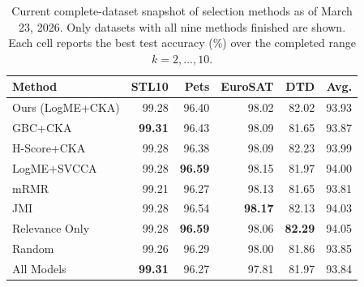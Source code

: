\begin{table}[t]
\centering
\small
\begin{tabular}{lrrrrr}
\hline
Method & STL10 & Pets & EuroSAT & DTD & Avg. \\
\hline
Ours (LogME+CKA) & 99.28 & 96.40 & 98.02 & 82.02 & 93.93 \\
GBC+CKA & \textbf{99.31} & 96.43 & 98.09 & 81.65 & 93.87 \\
H-Score+CKA & 99.28 & 96.38 & 98.09 & 82.23 & 93.99 \\
LogME+SVCCA & 99.28 & \textbf{96.59} & 98.15 & 81.97 & 94.00 \\
mRMR & 99.21 & 96.27 & 98.13 & 81.65 & 93.81 \\
JMI & 99.28 & 96.54 & \textbf{98.17} & 82.13 & 94.03 \\
Relevance Only & 99.28 & \textbf{96.59} & 98.06 & \textbf{82.29} & 94.05 \\
Random & 99.26 & 96.29 & 98.00 & 81.86 & 93.85 \\
All Models & \textbf{99.31} & 96.27 & 97.81 & 81.97 & 93.84 \\
\hline
\end{tabular}
\caption{Current complete-dataset snapshot of selection methods as of March 23, 2026. Only datasets with all nine methods finished are shown. Each cell reports the best test accuracy (\%) over the completed range $k=2,\dots,10$.}
\label{tab:current-selection-snapshot}
\end{table}

